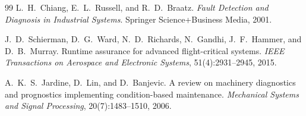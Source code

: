 \documentclass{llncs}
\begin{document}
{\begin{thebibliography}{99}
L.~H.~Chiang, E.~L.~Russell, and R.~D.~Braatz.
\textit{Fault Detection and Diagnosis in Industrial Systems}.
Springer Science+Business Media, 2001.

J.~D.~Schierman, D.~G.~Ward, N.~D.~Richards, N.~Gandhi, J.~F.~Hammer,
and D.~B.~Murray.
Runtime assurance for advanced flight-critical systems.
\textit{IEEE Transactions on Aerospace and Electronic Systems},
51(4):2931--2945, 2015.

A.~K.~S.~Jardine, D.~Lin, and D.~Banjevic.
A review on machinery diagnostics and prognostics implementing
condition-based maintenance.
\textit{Mechanical Systems and Signal Processing}, 20(7):1483--1510, 2006.

\end{thebibliography}
}
\end{document}
